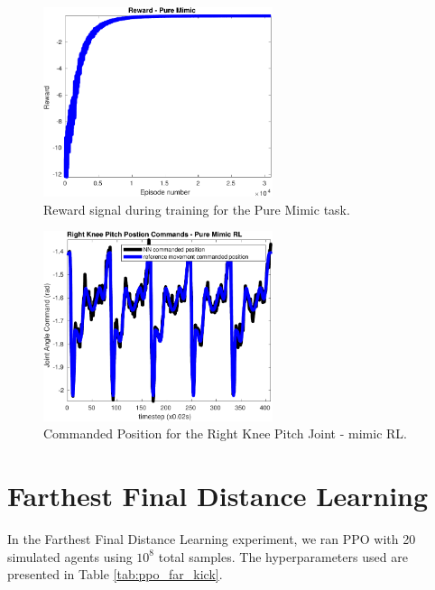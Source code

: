 \begin{figure}[H]
    \centering
    \includegraphics[width=0.6\textwidth]{Chapter7/plots/plot_reward_mimic.pdf} 
    \caption{Reward signal during training for the Pure Mimic task.}
    \label{fig:RL_mimic_reward}
\end{figure}

\begin{figure}[H]
    \centering
    \includegraphics[width=0.6\textwidth]{Chapter7/plots/plot_joints_pos_mimic.pdf} 
    \caption{Commanded Position for the Right Knee Pitch Joint - mimic RL.}
    \label{fig:RL_cmd_pos}
\end{figure}

\section{Farthest Final Distance Learning}
\label{sec:far_kick_results}

In the Farthest Final Distance Learning experiment, we ran PPO with 20 simulated agents using $10^8$ total samples. The hyperparameters used are presented in Table \ref{tab:ppo_far_kick}.

